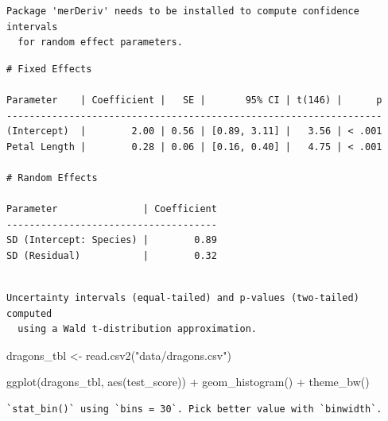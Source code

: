 \documentclass[
  letterpaper,
]{scrbook}
\newenvironment{Shaded}{\begin{snugshade}}{\end{snugshade}}
\newcommand{\FunctionTok}[1]{\textcolor[rgb]{0.28,0.35,0.67}{#1}}
\newcommand{\NormalTok}[1]{\textcolor[rgb]{0.00,0.23,0.31}{#1}}
\newcommand{\OtherTok}[1]{\textcolor[rgb]{0.00,0.23,0.31}{#1}}
\newcommand{\SpecialCharTok}[1]{\textcolor[rgb]{0.37,0.37,0.37}{#1}}
\newcommand{\StringTok}[1]{\textcolor[rgb]{0.13,0.47,0.30}{#1}}
\begin{document}
\begin{verbatim}
Package 'merDeriv' needs to be installed to compute confidence intervals
  for random effect parameters.
\end{verbatim}

\begin{verbatim}
# Fixed Effects

Parameter    | Coefficient |   SE |       95% CI | t(146) |      p
------------------------------------------------------------------
(Intercept)  |        2.00 | 0.56 | [0.89, 3.11] |   3.56 | < .001
Petal Length |        0.28 | 0.06 | [0.16, 0.40] |   4.75 | < .001

# Random Effects

Parameter               | Coefficient
-------------------------------------
SD (Intercept: Species) |        0.89
SD (Residual)           |        0.32
\end{verbatim}

\begin{verbatim}

Uncertainty intervals (equal-tailed) and p-values (two-tailed) computed
  using a Wald t-distribution approximation.
\end{verbatim}

\begin{Shaded}
\begin{Highlighting}[]
\NormalTok{dragons\_tbl }\OtherTok{\textless{}{-}} \FunctionTok{read.csv2}\NormalTok{(}\StringTok{"data/dragons.csv"}\NormalTok{)}
\end{Highlighting}
\end{Shaded}

\begin{Shaded}
\begin{Highlighting}[]
\FunctionTok{ggplot}\NormalTok{(dragons\_tbl, }\FunctionTok{aes}\NormalTok{(test\_score)) }\SpecialCharTok{+}
  \FunctionTok{geom\_histogram}\NormalTok{() }\SpecialCharTok{+}
  \FunctionTok{theme\_bw}\NormalTok{() }
\end{Highlighting}
\end{Shaded}

\begin{verbatim}
`stat_bin()` using `bins = 30`. Pick better value with `binwidth`.
\end{verbatim}
\end{document}
